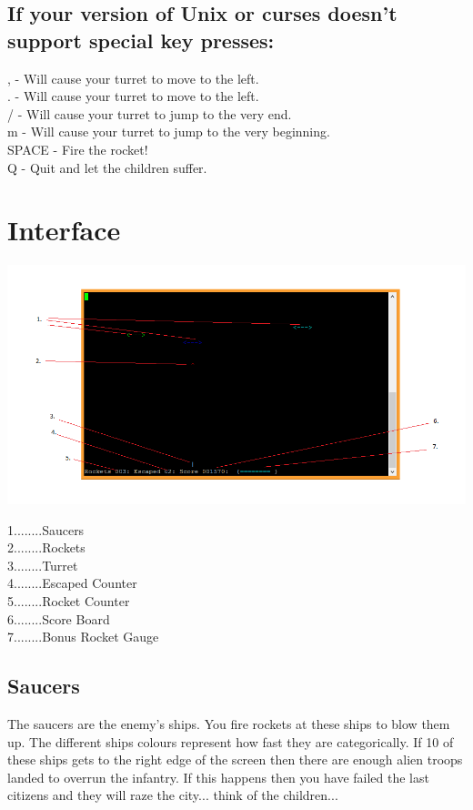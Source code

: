 \documentclass{article}
\begin{document}
\subsection*{If your version of Unix or curses doesn't support special key 
presses:}
, - Will cause your turret to move to the left.\\
. - Will cause your turret to move to the left.\\
/ - Will cause your turret to jump to the very end.\\
m - Will cause your turret to jump to the very beginning.\\
SPACE - Fire the rocket!\\
Q - Quit and let the children suffer.

\pagebreak
\section{Interface}

 \centerline{\includegraphics[width=\paperwidth]{saucerUI.png}}
1........Saucers\\
2........Rockets\\
3........Turret\\
4........Escaped Counter\\
5........Rocket Counter\\
6........Score Board\\
7........Bonus Rocket Gauge \\
\subsection{Saucers}
The saucers are the enemy's ships. You fire rockets at these ships to blow them
up. The different ships colours represent how fast they are categorically. If 
10 of these ships gets to the right edge of the screen then there are enough 
alien troops landed to overrun the infantry. If this happens then you have 
failed the last citizens and they will raze the city... think of the children...
\end{document}
